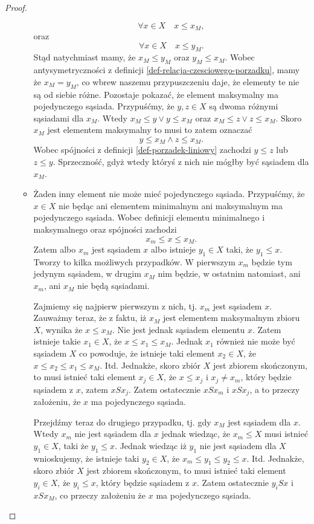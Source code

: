 \documentclass[12pt,a4paper]{report}
\begin{document}
\begin{proof}
\begin{enumerate}
\begin{itemize}
$$
\forall x \in X \quad x \leq x_M,
$$
oraz 
$$
\forall x \in X \quad x \leq y_M.
$$
Stąd natychmiast mamy, że $x_M \leq y_M$ oraz $y_M \leq  x_M$. Wobec antysymetryczności z definicji \ref{def-relacja-czesciowego-porzadku}, mamy że $x_M = y_M$, co wbrew naszemu przypuszczeniu daje, że elementy te nie są od siebie różne.
Pozostaje pokazać, że element maksymalny ma pojedynczego sąsiada. Przypuśćmy, że $y, z \in X$ są dwoma różnymi sąsiadami dla $x_M$. Wtedy $ x_M \leq y \lor y \leq x_M$ oraz $ x_M \leq z \lor z \leq x_M$. Skoro $x_M$ jest elementem maksymalny to musi to zatem oznaczać
$$
y \leq x_M \land z \leq x_M.
$$ 
Wobec spójności z definicji \ref{def-porzadek-liniowy} zachodzi $y \leq z$ lub $z \leq y$. Sprzeczność, gdyż wtedy któryś z nich nie mógłby być sąsiadem dla $x_M$.

\item Żaden inny element nie może mieć pojedynczego sąsiada. Przypuśćmy, że $x \in X$ nie będąc ani elementem minimalnym ani maksymalnym ma pojedynczego sąsiada. Wobec definicji elementu minimalnego i maksymalnego oraz spójności zachodzi
$$
x_m \leq x \leq x_M.
$$
Zatem albo $x_m$ jest sąsiadem $x$ albo istnieje $y_1 \in X$ taki, że $y_1 \leq x$.
Tworzy to kilka możliwych przypadków. W pierwszym $x_m$ będzie tym jedynym sąsiadem, w drugim $x_M$ nim będzie, w ostatnim natomiast, ani $x_m$, ani $x_M$ nie będą sąsiadami.

Zajmiemy się najpierw pierwszym z nich, tj. $x_m$ jest sąsiadem $x$. Zauważmy teraz, że z faktu, iż $x_M$ jest elementem maksymalnym zbioru $X$, wynika że $ x \leq x_M$. Nie jest jednak sąsiadem elementu $x$. Zatem istnieje takie $x_1 \in X$, że $x\leq x_1 \leq x_M$. Jednak $x_1$ również nie może być sąsiadem $X$ co powoduje, że istnieje taki element $x_2 \in X$, że $x \leq x_2 \leq x_1 \leq x_M$. Itd. Jednakże, skoro zbiór $X$ jest zbiorem skończonym, to musi istnieć taki element $x_j \in X$, że $x \leq x_j \textrm{ i } x_j \neq x_m$, który będzie sąsiadem z $x$, zatem $xSx_j$. Zatem ostatecznie $xSx_m$ i $xSx_j$, a to przeczy założeniu, że $x$ ma pojedynczego sąsiada. 

Przejdźmy teraz do drugiego przypadku, tj. gdy $x_M$ jest sąsiadem dla $x$. Wtedy $x_m$ nie jest sąsiadem dla $x$ jednak wiedząc, że $x_m \leq X$ musi istnieć $y_1\in X$, taki że $y_1 \leq x$. Jednak wiedząc iż $y_1$ nie jest sąsiadem dla $X$ wnioskujemy, że istnieje taki $y_2 \in X$, że $x_m \leq y_1 \leq y_2 \leq x$. Itd.  Jednakże, skoro zbiór $X$ jest zbiorem skończonym, to musi istnieć taki element $y_i \in X$, że $y_i \leq x$, który będzie sąsiadem z $x$. Zatem ostatecznie $y_iSx$ i $xSx_M$, co przeczy założeniu że $x$ ma pojedynczego sąsiada.


\end{itemize}
\end{enumerate}
\end{proof}
\end{document}
